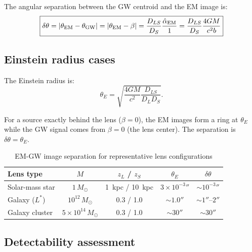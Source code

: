 \documentclass[11pt]{article}
\newcommand{\ee}[1]{\times 10^{#1}}
\begin{document}
The angular separation between the GW centroid and the EM image is:
\begin{equation}\label{eq:delta-theta}
\boxed{
\delta\theta = |\theta_{\rm EM} - \theta_{\rm GW}|
= |\theta_{\rm EM} - \beta|
= \frac{D_{LS}}{D_S}\frac{\hat{\alpha}_{\rm EM}}{1}
= \frac{D_{LS}}{D_S}\frac{4GM}{c^2 b}
}
\end{equation}

\subsection{Einstein radius cases}

The Einstein radius is:
\begin{equation}
\theta_E = \sqrt{\frac{4GM}{c^2}\frac{D_{LS}}{D_L D_S}}.
\end{equation}

For a source exactly behind the lens ($\beta = 0$), the EM images
form a ring at $\theta_E$ while the GW signal comes from $\beta = 0$
(the lens center). The separation is $\delta\theta = \theta_E$.

\begin{table}[H]
\centering
\caption{EM-GW image separation for representative lens configurations}
\begin{tabular}{lcccc}
\toprule
Lens type & $M$ & $z_L$ / $z_S$ & $\theta_E$ & $\delta\theta$ \\
\midrule
Solar-mass star & $1\,M_\odot$ & 1~kpc / 10~kpc & $3\ee{-3}''$ & $\sim 10^{-3}''$ \\
Galaxy ($L^*$) & $10^{12}\,M_\odot$ & 0.3 / 1.0 & $\sim 1.0''$ & $\sim 1''$--$2''$ \\
Galaxy cluster & $5\ee{14}\,M_\odot$ & 0.3 / 1.0 & $\sim 30''$ & $\sim 30''$ \\
\bottomrule
\end{tabular}
\label{tab:separations}
\end{table}

\subsection{Detectability assessment}
\end{document}
